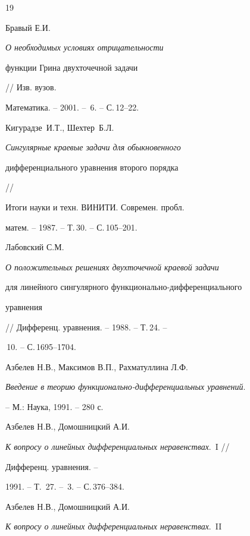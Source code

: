 \begin{thebibliography}{19}







Бравый Е.И. {\em О необходимых условиях отрицательности


функции Грина двухточечной задачи} // Изв. вузов.


Математика. -- 2001. -- \No\,{6}. -- С.\,12--22.





 Кигурадзе~И.Т., Шехтер~Б.Л.


{\em  Сингулярные краевые задачи для обыкновенного


дифференциального уравнения второго порядка} //


Итоги науки и техн. ВИНИТИ. Современ. пробл.


матем. -- 1987. -- Т.\,30. -- С.\,105--201.





 Лабовский С.М.


{\em О положительных решениях двухточечной краевой задачи


для линейного сингулярного функционально-дифференциального


уравнения} // Дифференц.  уравнения. -- 1988. -- Т.\,24. --


\No\,{10}. -- С.\,1695--1704.





 Азбелев Н.В., Максимов В.П., Рахматуллина Л.Ф.


{\em Введение в теорию функционально-дифференциальных уравнений}.


-- М.: Наука,  1991. -- 280 с.





 Азбелев Н.В., Домошницкий А.И.


{\em К вопросу о линейных дифференциальных неравенствах}.~I //


Дифференц. уравнения. --


1991. -- Т.~27. -- \No\,{3}. -- С.\,376--384.





 Азбелев Н.В., Домошницкий А.И.


{\em К вопросу о линейных дифференциальных неравенствах}.~II



\end{thebibliography}

